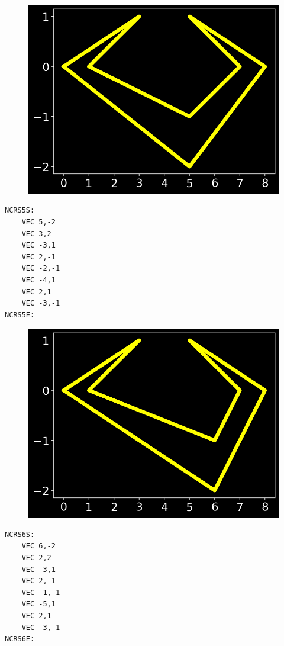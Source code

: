 \begin{minipage}[b]{0.48\linewidth}
\begin{figure}[H]
    \centering
    \begin{adjustbox}{width=4.5cm,center}
      \includegraphics[width=12cm]{src/cursors/final_cursor_4.png}%
    \end{adjustbox}
\end{figure}
\end{minipage}
\begin{minipage}[b]{0.48\linewidth}
\begin{lstlisting}
NCRS5S:
	VEC 5,-2
	VEC 3,2
	VEC -3,1
	VEC 2,-1
	VEC -2,-1
	VEC -4,1
	VEC 2,1
	VEC -3,-1
NCRS5E:
\end{lstlisting}
\end{minipage}

\begin{minipage}[b]{0.48\linewidth}
\begin{figure}[H]
    \centering
    \begin{adjustbox}{width=4.5cm,center}
      \includegraphics[width=12cm]{src/cursors/final_cursor_5.png}%
    \end{adjustbox}
\end{figure}
\end{minipage}
\begin{minipage}[b]{0.48\linewidth}
\begin{lstlisting}
NCRS6S:
	VEC 6,-2
	VEC 2,2
	VEC -3,1
	VEC 2,-1
	VEC -1,-1
	VEC -5,1
	VEC 2,1
	VEC -3,-1
NCRS6E:
\end{lstlisting}
\end{minipage}

